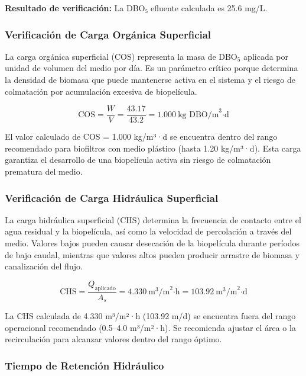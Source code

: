 \documentclass[12pt,a4paper]{article}
\begin{document}
\textbf{Resultado de verificación:} La DBO₅ efluente calculada es 25.6 mg/L.

\subsubsection*{Verificación de Carga Orgánica Superficial}

La carga orgánica superficial (COS) representa la masa de DBO$_5$ aplicada por unidad de volumen del medio por día. Es un parámetro crítico porque determina la densidad de biomasa que puede mantenerse activa en el sistema y el riesgo de colmatación por acumulación excesiva de biopelícula.

\begin{equation}
\text{COS} = \frac{W}{V} = \frac{43.17}{43.2} = 1.000\ \text{kg DBO/m}^3\text{·d}
\end{equation}

El valor calculado de COS = 1.000 kg/m³·d se encuentra dentro del rango recomendado para biofiltros con medio plástico (hasta 1.20 kg/m³·d). Esta carga garantiza el desarrollo de una biopelícula activa sin riesgo de colmatación prematura del medio.

\subsubsection*{Verificación de Carga Hidráulica Superficial}

La carga hidráulica superficial (CHS) determina la frecuencia de contacto entre el agua residual y la biopelícula, así como la velocidad de percolación a través del medio. Valores bajos pueden causar desecación de la biopelícula durante períodos de bajo caudal, mientras que valores altos pueden producir arrastre de biomasa y canalización del flujo.

\begin{equation}
\text{CHS} = \frac{Q_{\text{aplicado}}}{A_s} = 4.330\ \text{m}^3\text{/m}^2\text{·h} = 103.92\ \text{m}^3\text{/m}^2\text{·d}
\end{equation}

La CHS calculada de 4.330 m³/m²·h (103.92 m/d) se encuentra fuera del rango operacional recomendado (0.5--4.0 m³/m²·h). Se recomienda ajustar el área o la recirculación para alcanzar valores dentro del rango óptimo.

\subsubsection*{Tiempo de Retención Hidráulico}
\end{document}
